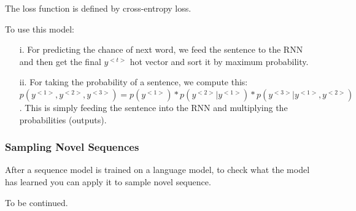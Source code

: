 The loss function is defined by cross-entropy loss.

To use this model:
\begin{itemize}
    \item[i.] For predicting the chance of next word, we feed the sentence to the RNN and then get the final $y^{<t>}$ hot vector and sort it by maximum probability.
    \item[ii.] For taking the probability of a sentence, we compute this: $p(y^{<1>}, y^{<2>}, y^{<3>}) = p(y^{<1>}) * p(y^{<2>} | y^{<1>}) * p(y^{<3>} | y^{<1>}, y^{<2>})$. This is simply feeding the sentence into the RNN and multiplying the probabilities (outputs).
\end{itemize}

\subsubsection{Sampling Novel Sequences}
After a sequence model is trained on a language model, to check what the model has learned you can apply it to sample novel sequence.

To be continued.

\newpage